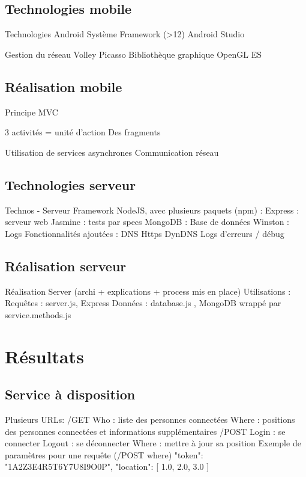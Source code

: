 \documentclass{beamer} %
\begin{document}
  \subsection{Technologies mobile}
  \begin{frame}{\subsecname}
    Technologies
    Android
    Système
    Framework (>12)
    Android Studio

    Gestion du réseau
    Volley
    Picasso
    Bibliothèque graphique
    OpenGL ES
  \end{frame}

  \subsection{Réalisation mobile}
  \begin{frame}{\subsecname}
    Principe MVC

    3 activités
    = unité d’action
    Des fragments

    Utilisation de services asynchrones
    Communication réseau
  \end{frame}

  \subsection{Technologies serveur}
  \begin{frame}{\subsecname}
    Technos - Serveur
    Framework NodeJS, avec plusieurs paquets (npm) :
    Express : serveur web
    Jasmine : tests par specs
    MongoDB : Base de données
    Winston : Logs
    Fonctionnalités ajoutées :
    DNS
    Https
    DynDNS
    Logs d’erreurs / débug
  \end{frame}

  \subsection{Réalisation serveur}
  \begin{frame}{\subsecname}
    Réalisation Server (archi + explications + process mis en place)
    Utilisations :
    Requêtes : server.js, Express
    Données : database.js , MongoDB wrappé par service.methods.js
  \end{frame}

  \section{Résultats}
  \subsection{Service à disposition}
  \begin{frame}{\subsecname}
    Plusieurs URLs:
    /GET
    Who : liste des personnes connectées
    Where : positions des personnes connectées et informations supplémentaires
    /POST
    Login : se connecter
    Logout : se déconnecter
    Where : mettre à jour sa position
    Exemple de paramètres pour une requête (/POST where){
        "token": "1A2Z3E4R5T6Y7U8I9O0P",
        "location": [
            1.0,
            2.0,
            3.0
        ]
    }  
  \end{frame}
\end{document}

